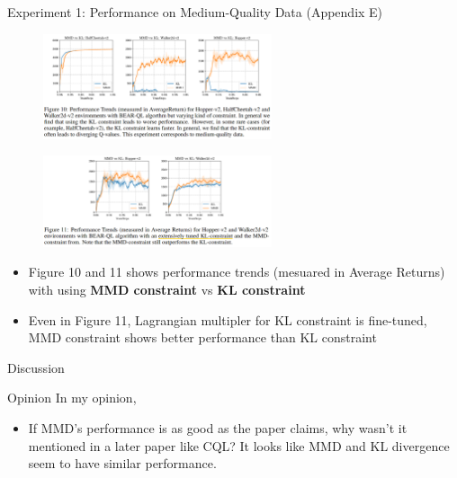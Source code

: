\documentclass[11pt]{beamer}
\newcommand{\tb}[1]{\textbf{#1}}
\begin{document}
\begin{frame}{Experiment 1: Performance on Medium-Quality Data (Appendix E)}
    \begin{figure}
        \centering
        \includegraphics[width=0.6\textwidth]{Figure10.png}
    \end{figure}
    \begin{figure}
        \centering
        \includegraphics[width=0.6\textwidth]{Figure11.png}
    \end{figure}
    \begin{itemize}
        \item Figure 10 and 11 shows performance trends (mesuared in Average Returns) with using \tb{MMD constraint} vs \tb{KL constraint}
        \item Even in Figure 11, Lagrangian multipler for KL constraint is fine-tuned, MMD constraint shows better performance than KL constraint
    \end{itemize}
\end{frame}


\begin{frame}{Discussion}
    \begin{block}{Opinion}
        In my opinion,
        \begin{itemize}
            \item If MMD's performance is as good as the paper claims, why wasn't it mentioned in a later paper like CQL? It looks like MMD and KL divergence seem to have similar performance.
        \end{itemize}
    \end{block}
\end{frame}
\end{document}
